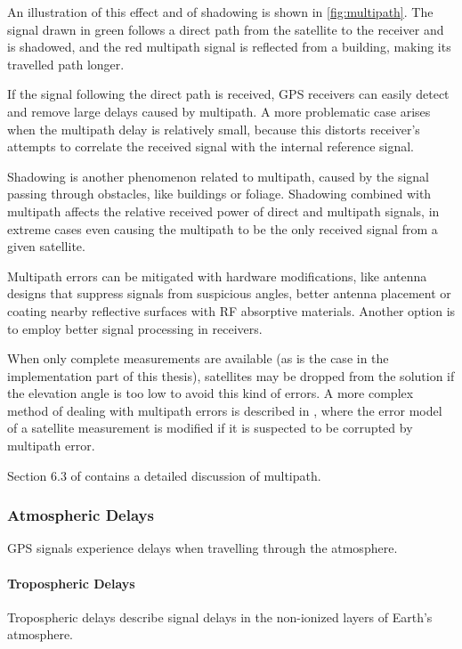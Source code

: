 An illustration of this effect and of shadowing is shown in \cref{fig:multipath}.
The signal drawn in green follows a direct path from the satellite to the receiver and is shadowed,
and the red multipath signal is reflected from a building, making its travelled path longer.

If the signal following the direct path is received, GPS receivers can easily detect and remove large delays caused by multipath.
A more problematic case arises when the multipath delay is relatively small, because this distorts
receiver's attempts to correlate the received signal with the internal reference signal.

Shadowing is another phenomenon related to multipath, caused by the signal passing through obstacles, like buildings or foliage.
Shadowing combined with multipath affects the relative received power of direct and multipath signals, in extreme cases
even causing the multipath to be the only received signal from a given satellite.

Multipath errors can be mitigated with hardware modifications, like antenna designs that suppress signals from suspicious angles,
better antenna placement or coating nearby reflective surfaces with RF absorptive materials.
Another option is to employ better signal processing in receivers.

When only complete measurements are available (as is the case in the implementation part of this thesis),
satellites may be dropped from the solution if the elevation angle
is too low to avoid this kind of errors.
A more complex method of dealing with multipath errors is described in \cite{viandier08},
where the error model of a satellite measurement is modified if it is suspected to be corrupted
by multipath error.

Section 6.3 of \cite{kaplan06} contains a detailed discussion of multipath.

\subsubsection{Atmospheric Delays}

GPS signals experience delays when travelling through the atmosphere.

\paragraph{Tropospheric Delays}
Tropospheric delays describe signal delays in the non-ionized layers of Earth's atmosphere.

